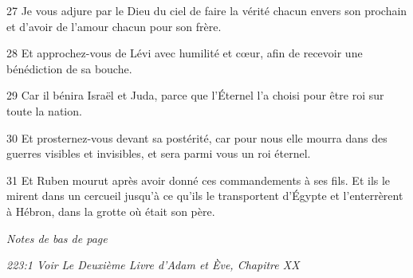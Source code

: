 \par 27 Je vous adjure par le Dieu du ciel de faire la vérité chacun envers son prochain et d'avoir de l'amour chacun pour son frère.

\par 28 Et approchez-vous de Lévi avec humilité et cœur, afin de recevoir une bénédiction de sa bouche.

\par 29 Car il bénira Israël et Juda, parce que l'Éternel l'a choisi pour être roi sur toute la nation.

\par 30 Et prosternez-vous devant sa postérité, car pour nous elle mourra dans des guerres visibles et invisibles, et sera parmi vous un roi éternel.

\par 31 Et Ruben mourut après avoir donné ces commandements à ses fils. Et ils le mirent dans un cercueil jusqu'à ce qu'ils le transportent d'Égypte et l'enterrèrent à Hébron, dans la grotte où était son père.

\par \textit{Notes de bas de page}

\par \textit{223:1 Voir Le Deuxième Livre d'Adam et Ève, Chapitre XX}


